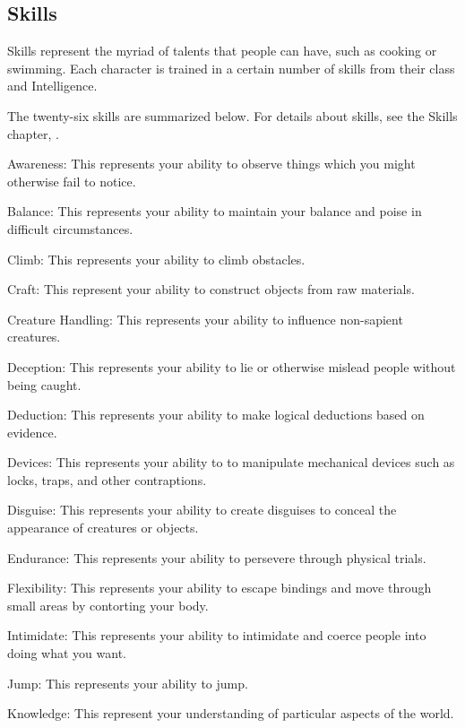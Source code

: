     \subsection{Skills}
        Skills represent the myriad of talents that people can have, such as cooking or swimming.
        Each character is trained in a certain number of skills from their class and Intelligence.

        The twenty-six skills are summarized below.
        For details about skills, see the Skills chapter, .

        \begin{raggeditemize}
            \item Awareness: This represents your ability to observe things which you might otherwise fail to notice.
            \item Balance: This represents your ability to maintain your balance and poise in difficult circumstances.
            \item Climb: This represents your ability to climb obstacles.
            \item Craft: This represent your ability to construct objects from raw materials.
            \item Creature Handling: This represents your ability to influence non-sapient creatures.
            \item Deception: This represents your ability to lie or otherwise mislead people without being caught.
            \item Deduction: This represents your ability to make logical deductions based on evidence.
            \item Devices: This represents your ability to to manipulate mechanical devices such as locks, traps, and other contraptions.
            \item Disguise: This represents your ability to create disguises to conceal the appearance of creatures or objects.
            \item Endurance: This represents your ability to persevere through physical trials.
            \item Flexibility: This represents your ability to escape bindings and move through small areas by contorting your body.
            \item Intimidate: This represents your ability to intimidate and coerce people into doing what you want.
            \item Jump: This represents your ability to jump.
            \item Knowledge: This represent your understanding of particular aspects of the world.

\end{raggeditemize}
